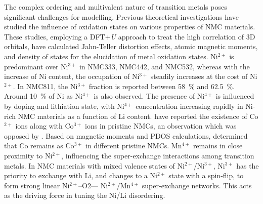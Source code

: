 \documentclass[journal=jacsat,manuscript=article]{achemso}
\begin{document}
The complex ordering and multivalent nature of transition metals poses significant challenges for modelling. Previous theoretical investigations have studied the influence of oxidation states on various properties of NMC materials.\cite{Dan-Thomas-chemmater,Sun_JPhysChemC2017,Dixit_JPhysChemC2017,Hoang_ACSChemMater2016,Dixit_JElecSoc2017,susai2019improving}
These studies, employing a DFT+\textit{U} approach to treat the high correlation of 3D orbitals, have calculated Jahn-Teller distortion effects, atomic magnetic moments, and density of states for the elucidation of metal oxidation states. 
Ni$^{2+}$ is predominant over Ni$^{3+}$ in NMC333, NMC442, and NMC532, whereas with the increase of Ni content, the occupation of Ni$^{3+}$ steadily increases at the cost of Ni$^{2+}$. 
In NMC811, the Ni$^{3+}$ fraction is reported between 58~\%\cite{Sun_JPhysChemC2017} and 62.5~\%.\cite{susai2019improving}
Around 10~\% of Ni as Ni$^{4+}$ is also observed.\cite{susai2019improving} 
The presence of Ni$^{4+}$ is influenced by doping and lithiation state, with Ni$^{4+}$ concentration increasing rapidly in Ni-rich NMC materials as a function of Li content.\cite{Dixit_JPhysChemC2017,susai2019improving} 
\citeauthor{Sun_JPhysChemC2017}\cite{Sun_JPhysChemC2017} have reported the existence of Co$^{2+}$ ions along with Co$^{3+}$ ions in pristine NMCs, an observation which was opposed by \citeauthor{Dixit_JPhysChemC2017}.\cite{Dixit_JPhysChemC2017}
Based on magnetic moments and PDOS calculations, \citeauthor{Dixit_JPhysChemC2017} determined that Co remains as Co$^{3+}$ in different pristine NMCs.\cite{Dixit_JPhysChemC2017}
Mn$^{4+}$ remains in close proximity to Ni$^{2+}$, influencing the super-exchange interactions among transition metals.\cite{zheng2019}
In NMC materials with mixed valence states of Ni$^{2+}$/Ni$^{3+}$, Ni$^{3+}$ has the priority to exchange with Li, and changes to a Ni$^{2+}$ state with a spin-flip, to form strong linear Ni$^{2+}$–O2–– Ni$^{2+}$/Mn$^{4+}$ super-exchange networks.\cite{zheng2019,Zheng-acs.jpclett-2017}
This acts as the driving force in tuning the Ni/Li disordering.
\end{document}
